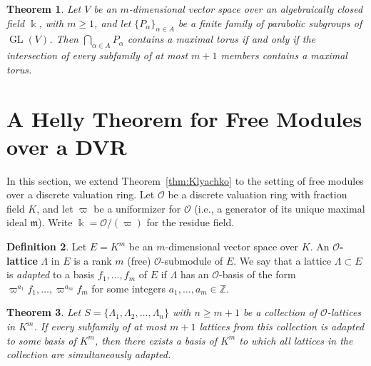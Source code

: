 \documentclass[12pt]{amsart}
\newtheorem{theorem}{Theorem}[section]
\theoremstyle{definition}
\newtheorem{definition}[theorem]{Definition}
\theoremstyle{remark}
\newcommand{\Kiu}[1]{{\color{blue}(K: #1)}}
\begin{document}
\begin{theorem}
\label{thm:parabolics}
Let \(V\) be an \(m\)-dimensional vector space over an algebraically closed field \(\Bbbk\), with \(m\geq 1\), and let \(\{P_\alpha\}_{\alpha\in A}\) be a finite family of parabolic subgroups of \(\operatorname{GL}(V)\). Then \(\bigcap\limits_{\alpha\in A}P_\alpha\) contains a maximal torus if and only if the intersection of every subfamily of at most \(m+1\) members contains a maximal torus.
\end{theorem}

\section{A Helly Theorem for Free Modules over a DVR}
\label{sec:lattices}

 In this section, we extend Theorem~\ref{thm:Klyachko} to the setting of free modules over a discrete valuation ring. Let $\mathcal{O}$ be a discrete valuation ring with fraction field $K$, and let $\varpi$ be a uniformizer for $\mathcal{O}$ (i.e., a generator of its unique maximal ideal $\mathfrak{m}$). 
Write $\Bbbk=\mathcal O/(\varpi)$ for the residue field.

\begin{definition}
    Let \(E = K^m\) be an \(m\)-dimensional vector space over \(K\). An \textbf{\(\mathcal{O}\)-lattice} \(\Lambda\) in \(E\) is a rank \(m\) (free) \(\mathcal{O}\)-submodule of \(E\). We say that a lattice \( \Lambda \subset E \) is \emph{adapted} to a basis \( f_1, \dots, f_m \) of \( E \) if \( \Lambda \) has an \(\mathcal{O} \)-basis of the form \( \varpi^{a_1} f_1, \ldots, \varpi^{a_m} f_m \) for some integers \( a_1, \dots, a_m \in \mathbb{Z}\).
\end{definition}
 

\begin{theorem}
\label{thm-main}
Let  \(S = \{\Lambda_1, \Lambda_2, \dots, \Lambda_n\}\) with $n\ge m+1$ be a collection of \(\mathcal{O}\)-lattices in \( K^m \). If every subfamily of at most \(m+1\) lattices from this collection is adapted to some basis of \( K^m \), then there exists a basis of \(K^m \) to which all lattices in the collection are simultaneously adapted.
\end{theorem}
\end{document}
